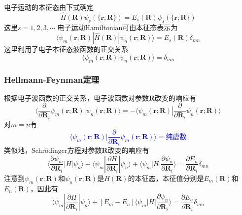 {{	电子运动的本征态由下式确定
	\begin{displaymath}
		\hat H(\mathbf{R})\psi_s(\{\mathbf{r};\mathbf{R}\})=E_s(\mathbf{R})\psi_s(\{\mathbf{r};\mathbf{R}\})
	\end{displaymath}
	这里$s=1,2,3,\cdots$
	电子运动\textrm{Hamiltonian}可由本征态表示为
	\begin{displaymath}
		\langle\psi_m(\mathbf{r};\mathbf{R})|\hat H(\mathbf{R})|\psi_n(\mathbf{r};\mathbf{R})\rangle=E_s(\mathbf{R})\delta_{mn}
	\end{displaymath}
	这里利用了电子本征态波函数的正交关系
	\begin{displaymath}
		\langle\psi_m(\mathbf{r};\mathbf{R})|\psi_n(\mathbf{r};\mathbf{R})\rangle=\delta_{mn}
	\end{displaymath}
}

\frame
{
	\frametitle{\textrm{Hellmann-Feynman}定理}
	根据电子波函数的正交关系，电子波函数对参数$\mathbf{R}$改变的响应有
	\begin{displaymath}
		\langle\dfrac{\partial}{\partial{\mathbf{R}_i}}\psi_m(\mathbf{r};\mathbf{R})|\psi_n(\mathbf{r};\mathbf{R})\rangle=-\langle\psi_m(\mathbf{r};\mathbf{R})|\dfrac{\partial}{\partial{\mathbf{R}_i}}\psi_n(\mathbf{r};\mathbf{R})\rangle
	\end{displaymath}
	对$m=n$有
	\textcolor{blue}{
		\begin{displaymath}
			\langle\psi_m(\mathbf{r};\mathbf{R})|\dfrac{\partial}{\partial{\mathbf{R}_i}}\psi_m(\mathbf{r};\mathbf{R})\rangle=\mbox{纯虚数}
		\end{displaymath} }
		类似地，\textrm{Schr\"odinger}方程对参数$\mathbf{R}$改变的响应有
		\begin{displaymath}
			\langle\dfrac{\partial\psi_m}{\partial{\mathbf{R}_i}}|H|\psi_n\rangle+\langle\psi_m|\dfrac{\partial H}{\partial{\mathbf{R}_i}}|\psi_n\rangle+\langle\psi_m|H|\dfrac{\partial\psi_n}{\partial{\mathbf{R}_i}}\rangle=\dfrac{\partial E_n}{\partial\mathbf{R}_i}\delta_{mn}
		\end{displaymath}
		注意到$\psi_m(\mathbf{r};\mathbf{R})$和$\psi_n(\mathbf{r};\mathbf{R})$是$H(\mathbf{R})$的本征态，本征值分别是$E_m(\mathbf{R})$和$E_n(\mathbf{R})$，因此有
		\begin{displaymath}
			\langle\psi_m|\dfrac{\partial H}{\partial{\mathbf{R}_i}}|\psi_n\rangle+[E_m-E_n]\langle\psi_m|H|\dfrac{\partial\psi_n}{\partial{\mathbf{R}_i}}\rangle=\dfrac{\partial E_n}{\partial\mathbf{R}_i}\delta_{mn}
		\end{displaymath}
}

}
